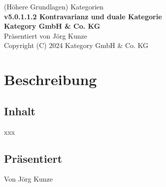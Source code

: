 \documentclass[a4paper]{amsart}
\theoremstyle{definition}
\begin{document}
\begin{titlepage}
\centering
{\huge
(Höhere Grundlagen) Kategorien\\[1cm]
\textbf{v5.0.1.1.2 Kontravarianz und duale Kategorie}
}\\[1cm]

\textbf{Kategory GmbH \& Co. KG}\\
Präsentiert von Jörg Kunze\\
Copyright (C) 2024 Kategory GmbH \& Co. KG

\end{titlepage}

%

\newpage

\section*{Beschreibung}

\subsection*{Inhalt}
xxx

\subsection*{Präsentiert}
Von Jörg Kunze
\end{document}
